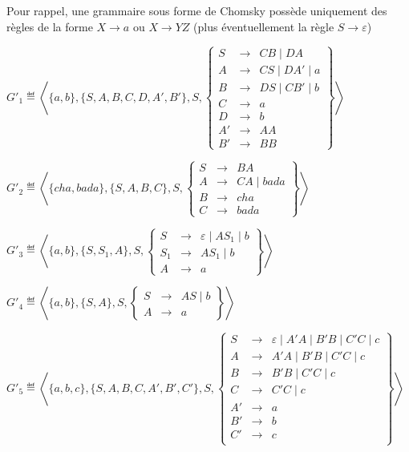 \begin{corrections}

  Pour rappel, une grammaire sous forme de Chomsky possède uniquement des règles de la
  forme $X\rightarrow a$ ou $X\rightarrow YZ$
  (plus éventuellement la règle $S\rightarrow\varepsilon$)
  \begin{questions}
  \item $G'_1\eqdef \left\langle\{a, b\}, \{S, A, B, C, D, A', B'\}, S,
    \left\{\begin{array}{lll}
    S   &\rightarrow& CB \mid  DA \\
    A   &\rightarrow& CS \mid  DA' \mid  a \\
    B   &\rightarrow& DS \mid  CB' \mid  b  \\
    C   &\rightarrow& a \\
    D   &\rightarrow& b \\
    A' &\rightarrow& AA \\
    B' &\rightarrow& BB
    \end{array}\right\}\right\rangle$
  \item $G'_2\eqdef \left\langle\{cha, bada\}, \{S, A, B, C\}, S,
    \left\{\begin{array}{lll}
    S   &\rightarrow& B A \\
    A   &\rightarrow& CA \mid  bada \\
    B   &\rightarrow& cha \\
    C   &\rightarrow& bada
    \end{array}\right\}\right\rangle$
  \item $G'_3\eqdef \left\langle\{a, b\}, \{S, S_1, A\}, S,
    \left\{\begin{array}{lll}
    S   &\rightarrow& \varepsilon \mid  AS_1 \mid  b \\
    S_1 &\rightarrow& AS_1 \mid  b \\
    A   &\rightarrow& a
    \end{array}\right\}\right\rangle$
  \item $G'_4\eqdef \left\langle\{a, b\}, \{S, A\}, S,
    \left\{\begin{array}{lll}
    S   &\rightarrow& AS \mid  b \\
    A   &\rightarrow& a
    \end{array}\right\}\right\rangle$
  \item $G'_5\eqdef \left\langle\{a, b,c \}, \{S, A, B, C, A', B', C'\}, S,
    \left\{\begin{array}{lll}
    S   &\rightarrow& \varepsilon \mid  A'A \mid  B'B \mid  C'C \mid  c \\
    A   &\rightarrow& A'A \mid  B'B \mid  C'C \mid  c \\
    B   &\rightarrow& B'B \mid  C'C \mid  c \\
    C   &\rightarrow& C'C \mid  c \\
    A'  &\rightarrow& a \\
    B'  &\rightarrow& b \\
    C'  &\rightarrow& c \\
    \end{array}\right\}\right\rangle$
  \end{questions}

\end{corrections}

\endgroup
\endinput
